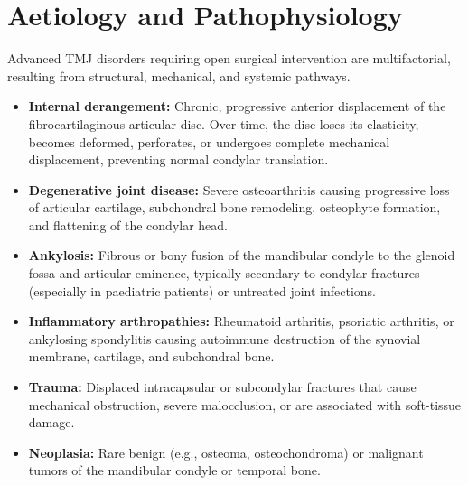 \section*{Aetiology and Pathophysiology}
Advanced TMJ disorders requiring open surgical intervention are multifactorial, resulting from structural, mechanical, and systemic pathways.
\begin{itemize}
    \item \textbf{Internal derangement:} Chronic, progressive anterior displacement of the fibrocartilaginous articular disc. Over time, the disc loses its elasticity, becomes deformed, perforates, or undergoes complete mechanical displacement, preventing normal condylar translation.
    \item \textbf{Degenerative joint disease:} Severe osteoarthritis causing progressive loss of articular cartilage, subchondral bone remodeling, osteophyte formation, and flattening of the condylar head.
    \item \textbf{Ankylosis:} Fibrous or bony fusion of the mandibular condyle to the glenoid fossa and articular eminence, typically secondary to condylar fractures (especially in paediatric patients) or untreated joint infections.
    \item \textbf{Inflammatory arthropathies:} Rheumatoid arthritis, psoriatic arthritis, or ankylosing spondylitis causing autoimmune destruction of the synovial membrane, cartilage, and subchondral bone.
    \item \textbf{Trauma:} Displaced intracapsular or subcondylar fractures that cause mechanical obstruction, severe malocclusion, or are associated with soft-tissue damage.
    \item \textbf{Neoplasia:} Rare benign (e.g., osteoma, osteochondroma) or malignant tumors of the mandibular condyle or temporal bone.
\end{itemize}

